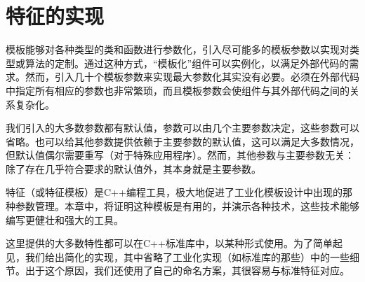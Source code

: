 \chapter{特征的实现}
模板能够对各种类型的类和函数进行参数化，引入尽可能多的模板参数以实现对类型或算法的定制。通过这种方式，“模板化”组件可以实例化，以满足外部代码的需求。然而，引入几十个模板参数来实现最大参数化其实没有必要。必须在外部代码中指定所有相应的参数也非常繁琐，而且模板参数会使组件与其外部代码之间的关系复杂化。

我们引入的大多数参数都有默认值，参数可以由几个主要参数决定，这些参数可以省略。也可以给其他参数提供依赖于主要参数的默认值，这可以满足大多数情况，但默认值偶尔需要重写（对于特殊应用程序）。然而，其他参数与主要参数无关：除了存在几乎符合要求的默认值外，其本身就是主要参数。

特征（或特征模板）是C++编程工具，极大地促进了工业化模板设计中出现的那种参数管理。本章中，将证明这种模板是有用的，并演示各种技术，这些技术能够编写更健壮和强大的工具。

这里提供的大多数特性都可以在C++标准库中，以某种形式使用。为了简单起见，我们给出简化的实现，其中省略了工业化实现（如标准库的那些）中的一些细节。出于这个原因，我们还使用了自己的命名方案，其很容易与标准特征对应。










